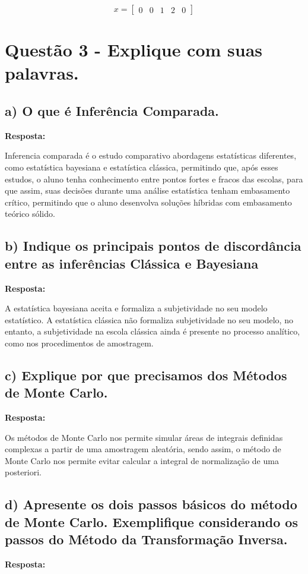 \documentclass{article}
\begin{document}
\[
x = \begin{bmatrix}
0 & 0 & 1 & 2 & 0
\end{bmatrix}
\]

\section*{Questão 3 - Explique com suas palavras.}
\subsection*{a) O que é Inferência Comparada.}
\textbf{Resposta:}

Inferencia comparada é o estudo comparativo abordagens estatísticas diferentes, como estatística bayesiana e estatística clássica, permitindo que, após esses estudos, o aluno tenha conhecimento entre pontos fortes e fracos das escolas, para que assim, suas decisões durante uma análise estatística tenham embasamento crítico, permitindo que o aluno desenvolva soluções híbridas com embasamento teórico sólido.

\subsection*{b)  Indique os principais pontos de discordância entre as inferências Clássica e Bayesiana}
\textbf{Resposta:}

A estatística bayesiana aceita e formaliza a subjetividade no seu modelo estatístico. A estatística clássica não formaliza subjetividade no seu modelo, no entanto, a subjetividade na escola clássica ainda é presente no processo analítico, como nos procedimentos de amostragem.

\subsection*{c) Explique por que precisamos dos Métodos de Monte Carlo.}
\textbf{Resposta:}

Os métodos de Monte Carlo nos permite simular áreas de integrais definidas complexas a partir de uma amostragem aleatória, sendo assim, o método de Monte Carlo nos permite evitar calcular a integral de normalização de uma posteriori.

\subsection*{d) Apresente os dois passos básicos do método de Monte Carlo. Exemplifique considerando os passos do Método da Transformação Inversa.}
\textbf{Resposta:}
\end{document}
